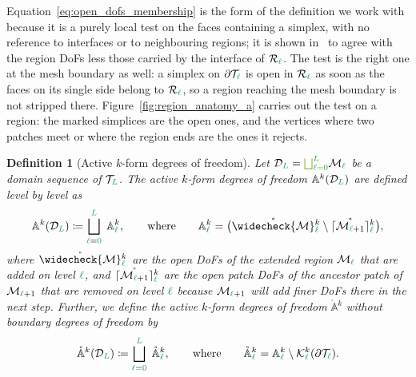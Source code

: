 \documentclass[a4paper, 12pt]{article}
\makeatletter
\newcommand{\guidance}[1]{{\color{lime!70!black} #1}}
\newcommand{\green}{\color{ForestGreen}}
\newcommand{\T}{\mathcal{T}}
\newcommand{\K}{\mathcal{K}}
\renewcommand{\l}{{\green\ell}}
\renewcommand{\L}{{\green L}}
\newcommand{\lzero}{{\green 0}}
\newcommand{\R}{\mathcal{R}}
\newcommand{\activeDoFs}{\mathbb{A}}
\newcommand{\activeDoFSet}[2]{\activeDoFs^{#1}_{#2}}
\newcommand{\activeDoFSetZero}[2]{\mathring{\activeDoFs}{}^{#1}_{#2}}
\newcommand{\M}{\mathcal{M}}
\newtheorem{definition}[theorem]{Definition}
\theoremstyle{definition}
\theoremstyle{plain}
\numberwithin{equation}{section}
\newcommand{\extendedPatch}[1]{\widecheck{#1}}
\newcommand{\ancestorPatch}[1]{\lceil #1 \rceil}
\DeclareRobustCommand{\domseq}[1][]{\mathcal{D}\ifx\@empty#1\@empty\else_{#1}\fi}
\newcommand{\boundary}{\partial}                            %
\newcommand{\openPatchDoFs}[2]{\mathring{#1}{}^{#2}}
\makeatother
\begin{document}
Equation~\eqref{eq:open_dofs_membership} is the form of the definition we work with because it is
a purely local test on the faces containing a simplex, with no reference to interfaces or to
neighbouring regions; it is shown in~\cite{companion_paper} to agree with the region DoFs less
those carried by the interface of $\R_\l$. The test is the right one at the mesh boundary as well:
a simplex on $\boundary\T_\l$ is open in $\R_\l$ as soon as the faces on its single side belong to
$\R_\l$, so a region reaching the mesh boundary is not stripped there.
Figure~\ref{fig:region_anatomy_a} carries out the test on a region:
the marked simplices are the open ones, and the vertices where two patches meet or where the
region ends are the ones it rejects.

\begin{definition}[Active $k$-form degrees of freedom]
    \label{def:active_k_form_dofs}
    Let $\domseq[\L] = \guidance{\bigsqcup_{\l = \lzero}^{\L}} \M_\l$ be a domain sequence of $\T_\L$. The
    active $k$-form degrees of freedom $\activeDoFSet{k}{}(\domseq[\L])$ are defined level by
    level as
    \begin{equation}
        \label{eq:active_k_form_dofs}
        \activeDoFSet{k}{} (\domseq[\L]) \coloneq \bigsqcup\limits_{\l = \lzero}^{\L} \; \activeDoFSet{k}{\l}, \qquad \text{where} \qquad \activeDoFSet{k}{\l} = \big( \openPatchDoFs{\extendedPatch{\M}}{k}_\l \setminus \openPatchDoFs{\ancestorPatch{\M_{\l+1}}}{k}_\l \big),
    \end{equation}
    where $\openPatchDoFs{\extendedPatch{\M}}{k}_\l$ are the open DoFs of the extended region $\M_\l$ that are added on level $\l$, and $\openPatchDoFs{\ancestorPatch{\M_{\l+1}}}{k}_\l$ are the open patch DoFs of the ancestor patch of $\M_{\l+1}$ that are removed on level $\l$ because $\M_{\l+1}$ will add finer DoFs there in the next step. Further, we define the active $k$-form degrees of freedom $\activeDoFSetZero{k}{}$ without boundary degrees of freedom by
    \begin{equation}
        \activeDoFSetZero{k}{} (\domseq[\L]) \coloneq \bigsqcup\limits_{\l = \lzero}^{\L} \; \activeDoFSetZero{k}{\l}, \qquad \text{where} \qquad \activeDoFSetZero{k}{\l} = \activeDoFSet{k}{\l} \setminus \K^k_\l(\partial \T_\l).
    \end{equation}
\end{definition}
\end{document}
